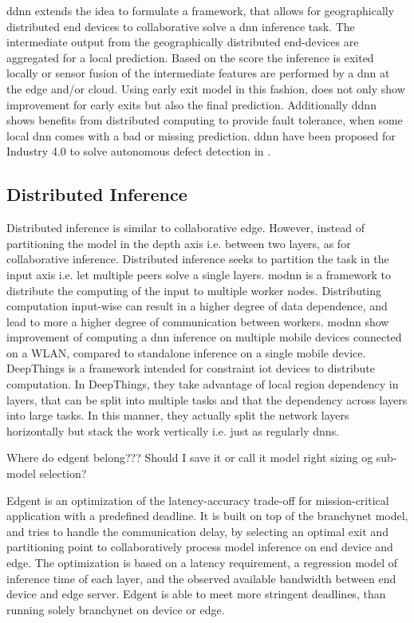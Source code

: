 \begin{enumdescript}
	\gls{ddnn} \cite{teerapittayanon_distributed_2017} extends the idea to formulate a framework, that allows for geographically distributed end devices to collaborative solve a \gls{dnn} inference task. The intermediate output from the geographically distributed end-devices are aggregated for a local prediction. Based on the score the inference is exited locally or sensor fusion of the intermediate features are performed by a \gls{dnn} at the edge and/or cloud. Using early exit model in this fashion, does not only show improvement for early exits but also the final prediction. Additionally \gls{ddnn} shows benefits from distributed computing to provide fault tolerance, when some local \gls{dnn} comes with a bad or missing prediction. \gls{ddnn} have been proposed for Industry 4.0 to solve autonomous defect detection in \cite{li_deep_2018}. 
\end{enumdescript}

\subsection{Distributed Inference}

Distributed inference is similar to collaborative edge. However, instead of partitioning the model in the depth axis i.e. between two layers, as for collaborative inference. Distributed inference seeks to partition the task in the input axis i.e. let multiple peers solve a single layers. \gls{modnn} \cite{mao_modnn:_2017} is a framework to distribute the computing of the input to multiple worker nodes. Distributing computation input-wise can result in a higher degree of data dependence, and lead to more a higher degree of communication between workers. \gls{modnn} show improvement of computing a \gls{dnn} inference on multiple mobile devices connected on a WLAN, compared to standalone inference on a single mobile device. DeepThings \cite{zhao_deepthings:_2018} is a framework intended for constraint \gls{iot} devices to distribute computation. In DeepThings, they take advantage of local region dependency in layers, that can be split into multiple tasks and that the dependency across layers into large tasks. In this manner, they actually split the network layers horizontally but stack the work vertically i.e. just as regularly \gls{dnn}s.




Where do edgent belong??? Should I save it or call it model right sizing og sub-model selection?

Edgent \cite{li_edge_2018} is an optimization of the latency-accuracy trade-off for mission-critical application with a predefined deadline. It is built on top of the \gls{branchynet} model, and tries to handle the communication delay, by selecting an optimal exit and partitioning point to collaboratively process model inference on end device and edge. The optimization is based on a latency requirement, a regression model of inference time of each layer, and the observed available bandwidth between end device and edge server. Edgent is able to meet more stringent deadlines, than running solely \gls{branchynet} on device or edge. 




